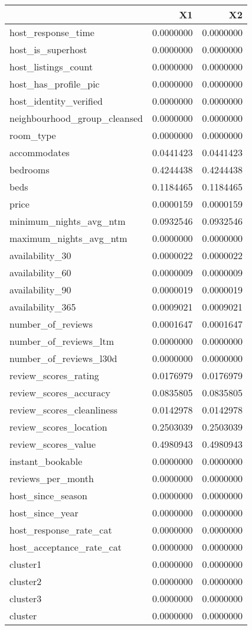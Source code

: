 
\begin{tabular}[t]{lrr}
\toprule
  & X1 & X2\\
\midrule
host\_response\_time & 0.0000000 & 0.0000000\\
host\_is\_superhost & 0.0000000 & 0.0000000\\
host\_listings\_count & 0.0000000 & 0.0000000\\
host\_has\_profile\_pic & 0.0000000 & 0.0000000\\
host\_identity\_verified & 0.0000000 & 0.0000000\\
\addlinespace
neighbourhood\_group\_cleansed & 0.0000000 & 0.0000000\\
room\_type & 0.0000000 & 0.0000000\\
accommodates & 0.0441423 & 0.0441423\\
bedrooms & 0.4244438 & 0.4244438\\
beds & 0.1184465 & 0.1184465\\
\addlinespace
price & 0.0000159 & 0.0000159\\
minimum\_nights\_avg\_ntm & 0.0932546 & 0.0932546\\
maximum\_nights\_avg\_ntm & 0.0000000 & 0.0000000\\
availability\_30 & 0.0000022 & 0.0000022\\
availability\_60 & 0.0000009 & 0.0000009\\
\addlinespace
availability\_90 & 0.0000019 & 0.0000019\\
availability\_365 & 0.0009021 & 0.0009021\\
number\_of\_reviews & 0.0001647 & 0.0001647\\
number\_of\_reviews\_ltm & 0.0000000 & 0.0000000\\
number\_of\_reviews\_l30d & 0.0000000 & 0.0000000\\
\addlinespace
review\_scores\_rating & 0.0176979 & 0.0176979\\
review\_scores\_accuracy & 0.0835805 & 0.0835805\\
review\_scores\_cleanliness & 0.0142978 & 0.0142978\\
review\_scores\_location & 0.2503039 & 0.2503039\\
review\_scores\_value & 0.4980943 & 0.4980943\\
\addlinespace
instant\_bookable & 0.0000000 & 0.0000000\\
reviews\_per\_month & 0.0000000 & 0.0000000\\
host\_since\_season & 0.0000000 & 0.0000000\\
host\_since\_year & 0.0000000 & 0.0000000\\
host\_response\_rate\_cat & 0.0000000 & 0.0000000\\
\addlinespace
host\_acceptance\_rate\_cat & 0.0000000 & 0.0000000\\
cluster1 & 0.0000000 & 0.0000000\\
cluster2 & 0.0000000 & 0.0000000\\
cluster3 & 0.0000000 & 0.0000000\\
cluster & 0.0000000 & 0.0000000\\
\bottomrule
\end{tabular}